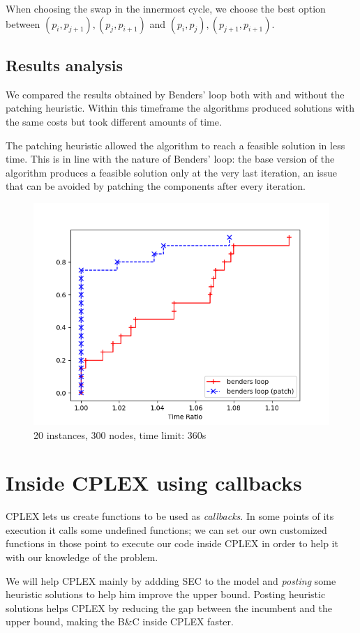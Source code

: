 When choosing the swap in the innermost cycle, we choose the best option between $(p_i,p_{j+1}),(p_j, p_{i+1})$ and $(p_i,p_j), (p_{j+1},p_{i+1})$.

\subsection{Results analysis}

We compared the results obtained by Benders' loop both with and without the patching heuristic. Within this timeframe the algorithms produced solutions with the same costs but took different amounts of time.

The patching heuristic allowed the algorithm to reach a feasible solution in less time. This is in line with the nature of Benders' loop: the base version of the algorithm produces a feasible solution only at the very last iteration, an issue that can be avoided by patching the components after every iteration.

\FloatBarrier
\begin{figure}[h]
    \centering
    \includegraphics*[width=.6\textwidth]{../plots/perfprof_benders_times.png}
    \caption*{20 instances, 300 nodes, time limit: 360s}
\end{figure}
\FloatBarrier

\section{Inside CPLEX using callbacks}

CPLEX lets us create functions to be used as \textit{callbacks}. In some points of its execution it calls some undefined functions; we can set our own customized functions in those point to execute our code inside CPLEX in order to help it with our knowledge of the problem.

We will help CPLEX mainly by addding SEC to the model and \textit{posting} some heuristic solutions to help him improve the upper bound. Posting heuristic solutions helps CPLEX by reducing the gap between the incumbent and the upper bound, making the B\&C inside CPLEX faster.

